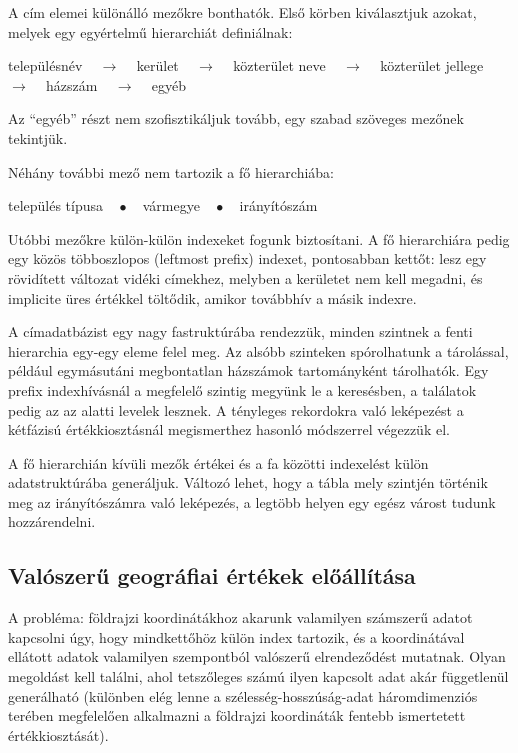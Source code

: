 \documentclass[
    parspace,
    noindent,
    nohyp,
]{elteiktdk}[2023/04/10]
\begin{document}
A cím elemei különálló mezőkre bonthatók.
Első körben kiválasztjuk azokat, melyek egy egyértelmű hierarchiát definiálnak:

\begin{center}
    településnév ~ $\rightarrow$ ~
    kerület ~ $\rightarrow$ ~
    közterület neve ~ $\rightarrow$ ~
    közterület jellege ~ $\rightarrow$ ~
    házszám ~ $\rightarrow$ ~
    egyéb
\end{center}

Az ``egyéb'' részt nem szofisztikáljuk tovább, egy szabad szöveges mezőnek tekintjük.

Néhány további mező nem tartozik a fő hierarchiába:

\begin{center}
    település típusa ~ $\bullet$ ~
    vármegye ~ $\bullet$ ~
    irányítószám
\end{center}

Utóbbi mezőkre külön-külön indexeket fogunk biztosítani.
A fő hierarchiára pedig egy közös többoszlopos (leftmost prefix) indexet,
pontosabban kettőt:
lesz egy rövidített változat vidéki címekhez, melyben a kerületet nem kell megadni,
és implicite üres értékkel töltődik, amikor továbbhív a másik indexre.

A címadatbázist egy nagy fastruktúrába rendezzük,
minden szintnek a fenti hierarchia egy-egy eleme felel meg.
Az alsóbb szinteken spórolhatunk a tárolással,
például egymásutáni megbontatlan házszámok tartományként tárolhatók.
Egy prefix indexhívásnál a megfelelő szintig megyünk le a keresésben,
a találatok pedig az az alatti levelek lesznek.
A tényleges rekordokra való leképezést
a kétfázisú értékkiosztásnál megismerthez hasonló módszerrel végezzük el.

A fő hierarchián kívüli mezők értékei és a fa közötti indexelést külön adatstruktúrába generáljuk.
Változó lehet, hogy a tábla mely szintjén történik meg az irányítószámra való leképezés,
a legtöbb helyen egy egész várost tudunk hozzárendelni.

\subsection{Valószerű geográfiai értékek előállítása}

A probléma: földrajzi koordinátákhoz akarunk valamilyen számszerű adatot kapcsolni úgy,
hogy mindkettőhöz külön index tartozik,
és a koordinátával ellátott adatok valamilyen szempontból valószerű elrendeződést mutatnak.
Olyan megoldást kell találni, ahol tetszőleges számú ilyen kapcsolt adat akár függetlenül generálható
(különben elég lenne a szélesség-hosszúság-adat háromdimenziós terében megfelelően alkalmazni
a földrajzi koordináták fentebb ismertetett értékkiosztását).
\end{document}
